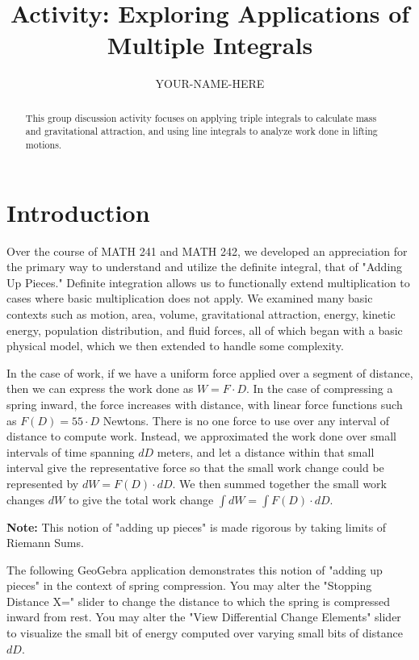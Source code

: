 \documentclass{ximera}
\title{Activity: Exploring Applications of Multiple Integrals}
\author{YOUR-NAME-HERE}
\begin{document}
\begin{abstract}
This group discussion activity focuses on applying triple integrals to calculate mass and gravitational attraction, and using line integrals to analyze work done in lifting motions.
\end{abstract}
\maketitle

\section{Introduction}

Over the course of MATH 241 and MATH 242, we developed an appreciation for the primary way to understand and utilize the definite integral, that of "Adding Up Pieces." Definite integration allows us to functionally extend multiplication to cases where basic multiplication does not apply. We examined many basic contexts such as motion, area, volume, gravitational attraction, energy, kinetic energy, population distribution, and fluid forces, all of which began with a basic physical model, which we then extended to handle some complexity.

In the case of work, if we have a uniform force applied over a segment of distance, then we can express the work done as $W=F\cdot D$. In the case of compressing a spring inward, the force increases with distance, with linear force functions such as $F(D)=55\cdot D$ Newtons. There is no one force to use over any interval of distance to compute work. Instead, we approximated the work done over small intervals of time spanning $dD$ meters, and let a distance within that small interval give the representative force so that the small work change could be represented by $dW=F(D)\cdot dD$. We then summed together the small work changes $dW$ to give the total work change $\int dW=\int F(D)\cdot dD$.

\textbf{Note:} This notion of "adding up pieces" is made rigorous by taking limits of Riemann Sums.

The following GeoGebra application demonstrates this notion of "adding up pieces" in the context of spring compression. You may alter the "Stopping Distance X=" slider to change the distance to which the spring is compressed inward from rest. You may alter the "View Differential Change Elements" slider to visualize the small bit of energy computed over varying small bits of distance $dD$.
\end{document}
